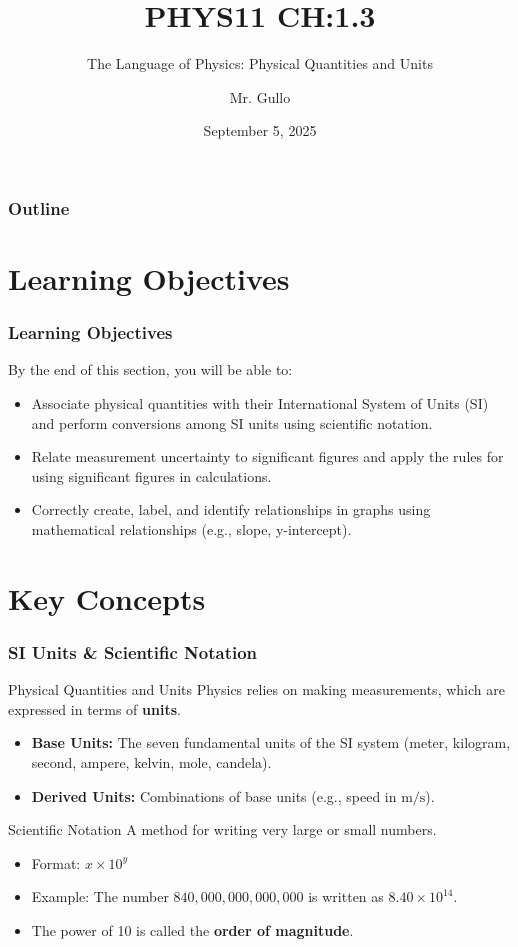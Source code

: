 \documentclass{beamer}
\title[CH 1.3]{PHYS11 CH:1.3}
\subtitle{The Language of Physics: Physical Quantities and Units}
\author[Mr. Gullo]{Mr. Gullo}
\date[Sept 2025]{September 5, 2025}
\begin{document}
\begin{frame}
    \titlepage
    \centering
\end{frame}

\begin{frame}
    \frametitle{Outline}
    \tableofcontents
\end{frame}

\section{Learning Objectives}
\begin{frame}
    \frametitle{Learning Objectives}
    By the end of this section, you will be able to:
    \pause
    \begin{itemize}
        \item Associate physical quantities with their International System of Units (SI) and perform conversions among SI units using scientific notation.
        \pause
        \item Relate measurement uncertainty to significant figures and apply the rules for using significant figures in calculations.
        \pause
        \item Correctly create, label, and identify relationships in graphs using mathematical relationships (e.g., slope, y-intercept).
    \end{itemize}
\end{frame}

\section{Key Concepts}
\begin{frame}
    \frametitle{SI Units \& Scientific Notation}
    \begin{block}{Physical Quantities and Units}
        Physics relies on making measurements, which are expressed in terms of \textbf{units}.
        \pause
        \begin{itemize}
            \item \textbf{Base Units:} The seven fundamental units of the SI system (meter, kilogram, second, ampere, kelvin, mole, candela).
            \pause
            \item \textbf{Derived Units:} Combinations of base units (e.g., speed in \(\text{m/s}\)).
        \end{itemize}
    \end{block}
    \pause
    \begin{block}{Scientific Notation}
        A method for writing very large or small numbers.
        \pause
        \begin{itemize}
            \item Format: \(x \times 10^y\)
            \pause
            \item Example: The number \(840,000,000,000,000\) is written as \(8.40 \times 10^{14}\).
            \pause
            \item The power of 10 is called the \textbf{order of magnitude}.
        \end{itemize}
    \end{block}
\end{frame}
\end{document}

